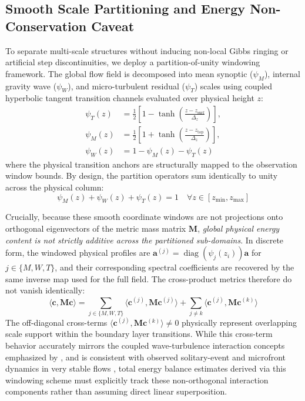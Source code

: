 \documentclass[11pt,a4paper]{article}
\begin{document}
\subsection{Smooth Scale Partitioning and Energy Non-Conservation Caveat}
\label{sec:methods:partition}

To separate multi-scale structures without inducing non-local Gibbs ringing or artificial step discontinuities, we deploy a partition-of-unity windowing framework. The global flow field is decomposed into mean synoptic ($\psi_M$), internal gravity wave ($\psi_W$), and micro-turbulent residual ($\psi_T$) scales using coupled hyperbolic tangent transition channels evaluated over physical height $z$:
\begin{equation}
\begin{aligned}
  \psi_T(z) &= \frac{1}{2}\left[1 - \tanh\left(\frac{z - z_{\mathrm{surf}}}{\Delta_z}\right)\right], \\
  \psi_M(z) &= \frac{1}{2}\left[1 + \tanh\left(\frac{z - z_{\mathrm{top}}}{\Delta_z}\right)\right], \\
  \psi_W(z) &= 1 - \psi_M(z) - \psi_T(z)
\end{aligned}
\label{eq:partition_scales_def}
\end{equation}
where the physical transition anchors are structurally mapped to the observation window bounds. By design, the partition operators sum identically to unity across the physical column:
\begin{equation}
\psi_M(z) + \psi_W(z) + \psi_T(z) = 1 \quad \forall z \in [z_{\min}, z_{\max}]
\label{eq:partition_unity}
\end{equation}

Crucially, because these smooth coordinate windows are not projections onto orthogonal eigenvectors of the metric mass matrix $\mathbf{M}$, \emph{global physical energy content is not strictly additive across the partitioned sub-domains}. In discrete form, the windowed physical profiles are $\mathbf{a}^{(j)} = \operatorname{diag}(\psi_j(z_i))\mathbf{a}$ for $j\in\{M,W,T\}$, and their corresponding spectral coefficients are recovered by the same inverse map used for the full field. The cross-product metrics therefore do not vanish identically:
\begin{equation}
\langle \mathbf{c}, \mathbf{M} \mathbf{c} \rangle = \sum_{j \in \{M,W,T\}} \langle \mathbf{c}^{(j)}, \mathbf{M} \mathbf{c}^{(j)} \rangle + \sum_{j \neq k} \langle \mathbf{c}^{(j)}, \mathbf{M} \mathbf{c}^{(k)} \rangle
\label{eq:energy_overlap}
\end{equation}
The off-diagonal cross-terms $\langle \mathbf{c}^{(j)}, \mathbf{M} \mathbf{c}^{(k)} \rangle \neq 0$ physically represent overlapping scale support within the boundary layer transitions. While this cross-term behavior accurately mirrors the coupled wave-turbulence interaction concepts emphasized by \citet{Sun2015}, and is consistent with observed solitary-event and microfront dynamics in very stable flows \citep{Mahrt2010}, total energy balance estimates derived via this windowing scheme must explicitly track these non-orthogonal interaction components rather than assuming direct linear superposition.
\end{document}
